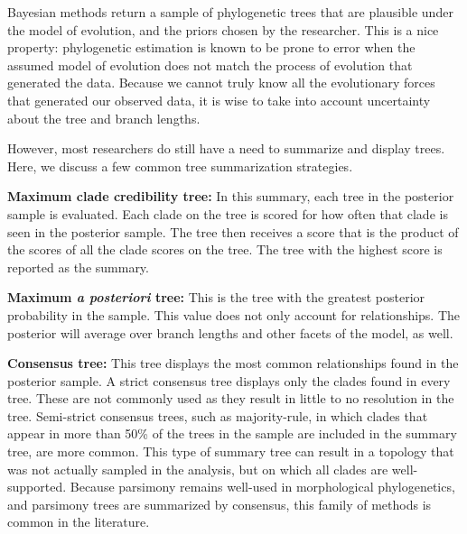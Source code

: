 \documentclass[11pt]{article}
\makeatletter
\newenvironment{boxedtext}[1]{%
  \begin{mdframed}[frametitle=#1,
    frametitlefont=\scshape\mdseries\sffamily,
    frametitlealignment=\centering,
    backgroundcolor=black!20,
    hidealllines=true,
    innerleftmargin=11\p@,innerrightmargin=11\p@,
    frametitleaboveskip=0.5\baselineskip,
    innerbottommargin=0.5\baselineskip,
    skipabove=\baselineskip,skipbelow=0.5\baselineskip]
}{%
  \end{mdframed}%
}
\makeatother
\begin{document}
\begin{boxedtext}{Summarizing the posterior sample of trees}

Bayesian methods return a sample of phylogenetic trees that are plausible under the model of evolution, and the priors chosen by the researcher. 
This is a nice property: phylogenetic estimation is known to be prone to error when the assumed model of evolution does not match the process of evolution that generated the data.
Because we cannot truly know all the evolutionary forces that generated our observed data, it is wise to take into account uncertainty about the tree and branch lengths.

However, most researchers do still have a need to summarize and display trees. 
Here, we discuss a few common tree summarization strategies.  

\textbf{Maximum clade credibility tree:} In this summary, each tree in the posterior sample is evaluated.
Each clade on the tree is scored for how often that clade is seen in the posterior sample.
The tree then receives a score that is the product of the scores of all the clade scores on the tree.
The tree with the highest score is reported as the summary. 

\textbf{Maximum \textit{a posteriori} tree:} This is the tree with the greatest posterior probability in the sample.
This value does not only account for relationships. 
The posterior will average over branch lengths and other facets of the model, as well.

\textbf{Consensus tree:} This tree displays the most common relationships found in the posterior sample. 
A strict consensus tree displays only the clades found in every tree.
These are not commonly used as they result in little to no resolution in the tree.
Semi-strict consensus trees, such as majority-rule, in which clades that appear in more than 50\% of the trees in the sample are included in the summary tree, are more common. 
This type of summary tree can result in a topology that was not actually sampled in the analysis, but on which all clades are well-supported. 
Because parsimony remains well-used in morphological phylogenetics, and parsimony trees are summarized by consensus, this family of methods is common in the literature.



\end{boxedtext}
\end{document}
